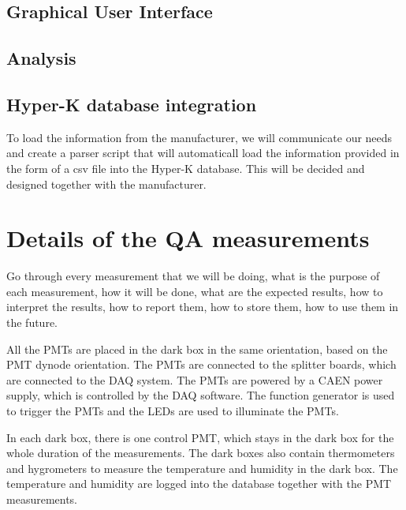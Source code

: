\documentclass[12pt,a4paper]{article}
\begin{document}
\subsection{Graphical User Interface}

\subsection{Analysis}

\subsection{Hyper-K database integration}
To load the information from the manufacturer, we will communicate our needs and create a parser script that will automaticall load the information provided in the form of a csv file into the Hyper-K database. This will be decided and designed together with the manufacturer.

\section{Details of the QA measurements}\label{sec:QAMeasurements}

Go through every measurement that we will be doing, what is the purpose of each measurement, how it will be done, what are the expected results, how to interpret the results, how to report them, how to store them, how to use them in the future.

All the PMTs are placed in the dark box in the same orientation, based on the PMT dynode orientation. The PMTs are connected to the splitter boards, which are connected to the DAQ system. The PMTs are powered by a CAEN power supply, which is controlled by the DAQ software. The function generator is used to trigger the PMTs and the LEDs are used to illuminate the PMTs.

In each dark box, there is one control PMT, which stays in the dark box for the whole duration of the measurements. The dark boxes also contain thermometers and hygrometers to measure the temperature and humidity in the dark box. The temperature and humidity are logged into the database together with the PMT measurements.
\end{document}
